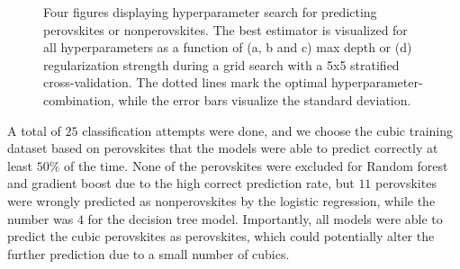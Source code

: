 \begin{figure}[!ht]
  \begin{subfigure}[b]{1.0\textwidth}
    \centering
    
  \end{subfigure}
  \par\bigskip
  \begin{subfigure}[b]{0.5\textwidth}
    
    \caption{}
    \label{fig:per-LOG}
  \end{subfigure}%
  \hfill
  \begin{subfigure}[b]{0.5\textwidth}
    
    \caption{}
    \label{fig:per-DT}
  \end{subfigure}

  \begin{subfigure}[b]{0.5\textwidth}
    
    \caption{}
    \label{fig:per-RF}
  \end{subfigure}%
  \hfill
  \begin{subfigure}[b]{0.5\textwidth}
    
    \caption{}
    \label{fig:per-GB}
  \end{subfigure}
  \vspace*{-130mm}
  \caption{{Four figures displaying hyperparameter search for predicting perovskites or nonperovskites. The best estimator is visualized for all hyperparameters as a function of (a, b and c) max depth or (d) regularization strength during a grid search with a 5x5 stratified cross-validation. The dotted lines mark the optimal hyperparameter-combination, while the error bars visualize the standard deviation. }}
  \label{fig:perovskite-params}
\end{figure}

A total of $25$ classification attempts were done, and we choose the cubic training dataset based on perovskites that the models were able to predict correctly at least $50\%$ of the time. None of the perovskites were excluded for Random forest and gradient boost due to the high correct prediction rate, but $11$ perovskites were wrongly predicted as nonperovskites by the logistic regression, while the number was $4$ for the decision tree model. Importantly, all models were able to predict the cubic perovskites as perovskites, which could potentially alter the further prediction due to a small number of cubics.

